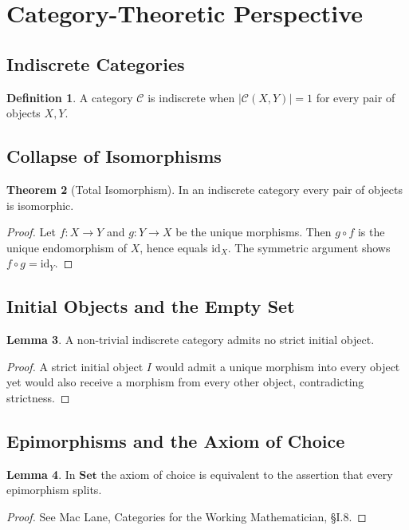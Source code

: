 \documentclass[11pt,a4paper]{article}
\theoremstyle{definition}
\newtheorem{theorem}{Theorem}[section]
\newtheorem{lemma}[theorem]{Lemma}
\newtheorem{definition}[theorem]{Definition}
\begin{document}
\section{Category-Theoretic Perspective}
\subsection{Indiscrete Categories}
\begin{definition}
A category \(\mathcal{C}\) is indiscrete when \(\lvert\mathcal{C}(X,Y)\rvert=1\) for every pair of objects \(X,Y\).
\end{definition}

\subsection{Collapse of Isomorphisms}
\begin{theorem}[Total Isomorphism]
In an indiscrete category every pair of objects is isomorphic.
\end{theorem}
\begin{proof}
Let \(f:X\to Y\) and \(g:Y\to X\) be the unique morphisms. Then \(g\circ f\) is the unique endomorphism of \(X\), hence equals \(\mathrm{id}_X\). The symmetric argument shows \(f\circ g=\mathrm{id}_Y\).
\end{proof}

\subsection{Initial Objects and the Empty Set}
\begin{lemma}
A non-trivial indiscrete category admits no strict initial object.
\end{lemma}
\begin{proof}
A strict initial object \(I\) would admit a unique morphism into every object yet would also receive a morphism from every other object, contradicting strictness.
\end{proof}

\subsection{Epimorphisms and the Axiom of Choice}
\begin{lemma}
In \(\mathbf{Set}\) the axiom of choice is equivalent to the assertion that every epimorphism splits.
\end{lemma}
\begin{proof}
See Mac Lane, Categories for the Working Mathematician, §I.8.
\end{proof}
\end{document}
